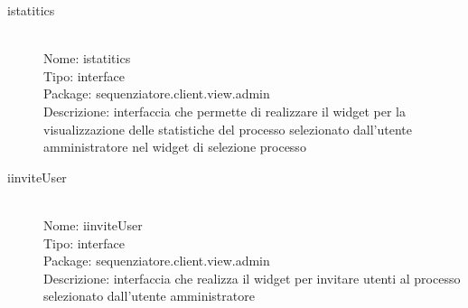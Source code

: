 \begin{description}
	\item[istatitics] 
  	\hfill \\
  	Nome: istatitics\\
  	Tipo: interface\\
	Package: sequenziatore.client.view.admin\\
	Descrizione: interfaccia che permette di realizzare il widget per la visualizzazione delle statistiche del processo selezionato dall'utente amministratore nel widget di selezione processo
\end{description}
\begin{description}
	\item[iinviteUser] 
  	\hfill \\
  	Nome: iinviteUser\\
  	Tipo: interface\\
	Package: sequenziatore.client.view.admin\\
	Descrizione: interfaccia che realizza il widget per invitare utenti al processo selezionato dall'utente amministratore
\end{description}